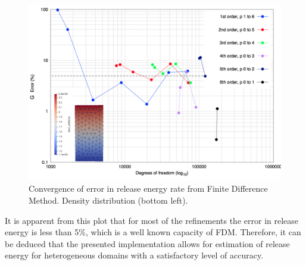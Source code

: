 \documentclass[11pt]{ACMEarticle}
\numberwithin{equation}{section}
\begin{document}
\begin{figure}
	\centering
	\includegraphics[width=0.7\linewidth]{Figures/graphs/covergence_FDM}
	\caption{Convergence of error in release energy rate from Finite Difference Method. Density distribution (bottom left).}
	\label{fig:covergencefdm}
\end{figure}
It is apparent from this plot that for most of the refinements the error in release energy is less than 5\%, which is a well known capacity of FDM.  %
Therefore, it can be deduced that the presented implementation allows for estimation of release energy for heterogeneous domains with a satisfactory level of accuracy.
\end{document}

